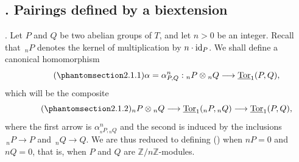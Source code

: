 
\subsection*{. Pairings defined by a biextension}

. Let $P$ and $Q$ be two abelian groups of $T$, and let $n>0$ be
an integer.  Recall that $\,{}_nP$ denotes the kernel of multiplication
by $n\cdot\mathrm{id}_P$.  We shall define a canonical homomorphism
\begin{equation}\tag{\SGARefTarget{sga7.sga7i.eviii.n2-1-1}{2.1.1}}
 \alpha=\alpha^n_{P,Q}:
 {}_nP\otimes{}_nQ\longrightarrow\uTor_1(P,Q),
\end{equation}
which will be the composite
\begin{equation}\tag{\SGARefTarget{sga7.sga7i.eviii.n2-1-2}{2.1.2}}
 {}_nP\otimes{}_nQ
 \longrightarrow \uTor_1({}_nP,{}_nQ)
 \longrightarrow \uTor_1(P,Q),
\end{equation}
where the first arrow is $\alpha^n_{{}_nP,{}_nQ}$ and the second is
induced by the inclusions $\,{}_nP\longrightarrow P$ and
$\,{}_nQ\longrightarrow Q$.  We are thus reduced to defining ()
when $nP=0$ and $nQ=0$, that is, when $P$ and $Q$ are
$\mathbb Z/n\mathbb Z$-modules.

